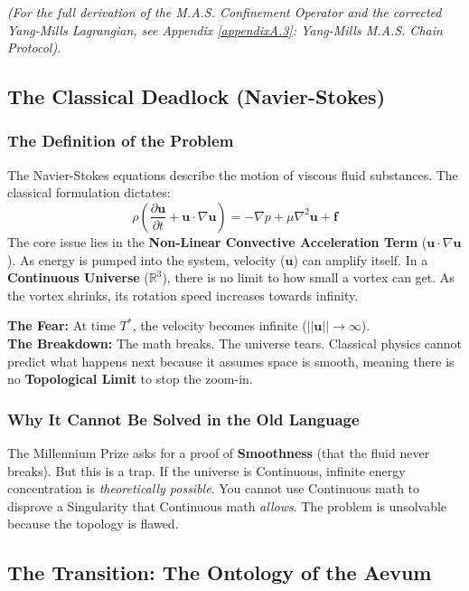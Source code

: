 \documentclass[12pt]{amsart}
\begin{document}
\noindent \textit{(For the full derivation of the M.A.S. Confinement Operator and the corrected Yang-Mills Lagrangian, see Appendix \ref{appendixA.3}: Yang-Mills M.A.S. Chain Protocol).}

\subsection{The Classical Deadlock (Navier-Stokes)}\label{sec:3}

\subsubsection{The Definition of the Problem}\label{sec:3.1}
The Navier-Stokes equations describe the motion of viscous fluid substances. The classical formulation dictates:
\begin{equation}
    \rho \left( \frac{\partial \mathbf{u}}{\partial t} + \mathbf{u} \cdot \nabla \mathbf{u} \right) = -\nabla p + \mu \nabla^2 \mathbf{u} + \mathbf{f}
\end{equation}
The core issue lies in the \textbf{Non-Linear Convective Acceleration Term} ($\mathbf{u} \cdot \nabla \mathbf{u}$). As energy is pumped into the system, velocity ($\mathbf{u}$) can amplify itself. In a \textbf{Continuous Universe} ($\mathbb{R}^3$), there is no limit to how small a vortex can get. As the vortex shrinks, its rotation speed increases towards infinity.

\noindent \textbf{The Fear:} At time $T^*$, the velocity becomes infinite ($||\mathbf{u}|| \to \infty$). \\
\textbf{The Breakdown:} The math breaks. The universe tears. Classical physics cannot predict what happens next because it assumes space is smooth, meaning there is no \textbf{Topological Limit} to stop the zoom-in.

\subsubsection{Why It Cannot Be Solved in the Old Language}
The Millennium Prize asks for a proof of \textbf{Smoothness} (that the fluid never breaks). But this is a trap. If the universe is Continuous, infinite energy concentration is \textit{theoretically possible}. You cannot use Continuous math to disprove a Singularity that Continuous math \textit{allows}. The problem is unsolvable because the topology is flawed.

\subsection{The Transition: The Ontology of the Aevum}\label{sec:3.2}
\end{document}
